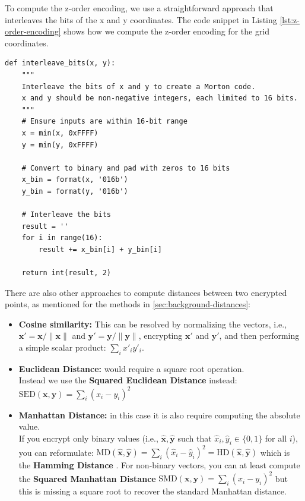 To compute the z-order encoding, we use a straightforward approach that interleaves the bits of the x and y coordinates. The code snippet in Listing \ref{lst:z-order-encoding} shows how we compute the z-order encoding for the grid coordinates.

\begin{lstlisting}[caption={Z-order encoding for grid coordinates}, label={lst:z-order-encoding}]
def interleave_bits(x, y):
    """
    Interleave the bits of x and y to create a Morton code.
    x and y should be non-negative integers, each limited to 16 bits.
    """
    # Ensure inputs are within 16-bit range
    x = min(x, 0xFFFF)
    y = min(y, 0xFFFF)
    
    # Convert to binary and pad with zeros to 16 bits
    x_bin = format(x, '016b')
    y_bin = format(y, '016b')
    
    # Interleave the bits
    result = ''
    for i in range(16):
        result += x_bin[i] + y_bin[i]
    
    return int(result, 2)
\end{lstlisting}


There are also other approaches to compute distances between two encrypted points\cite{ibarrond2022hedistancetricks}, as mentioned for the methods in \cref{sec:background-distances}:
\begin{itemize}
    \item \textbf{Cosine similarity:} This can be resolved by normalizing the vectors, i.e., $\mathbf{x}' = \mathbf{x} / \|\mathbf{x}\|$ and $\mathbf{y}' = \mathbf{y} / \|\mathbf{y}\|$, encrypting $\mathbf{x}'$ and $\mathbf{y}'$, and then performing a simple scalar product: $\sum_i x'_i y'_i$.
    
    \item \textbf{Euclidean Distance:} would require a square root operation.\\
    Instead we use the \textbf{Squared Euclidean Distance} instead:
    $
    \mathrm{SED}(\mathbf{x}, \mathbf{y}) = \sum_i (x_i - y_i)^2
    $
    
    \item \textbf{Manhattan Distance:} in this case it is also require computing the absolute value.\\
    If you encrypt only binary values (i.e., $\hat{\mathbf{x}}, \hat{\mathbf{y}}$ such that $\hat{x}_i, \hat{y}_i \in \{0,1\}$ for all $i$), you can reformulate:
    $
    \mathrm{MD}(\hat{\mathbf{x}}, \hat{\mathbf{y}}) = \sum_i (\hat{x}_i - \hat{y}_i)^2 = \mathrm{HD}(\hat{\mathbf{x}}, \hat{\mathbf{y}})
    $
    which is the \textbf{Hamming Distance} . For non-binary vectors, you can at least compute the \textbf{Squared Manhattan Distance}
    $
    \mathrm{SMD}(\mathbf{x}, \mathbf{y}) = \sum_i (x_i - y_i)^2
    $
    but this is missing a square root to recover the standard Manhattan distance.
    
\end{itemize}

